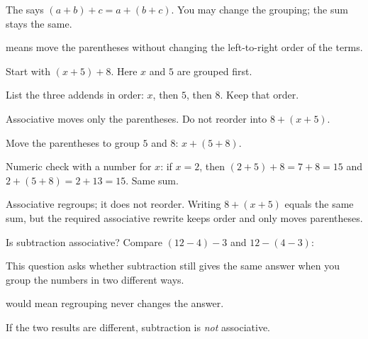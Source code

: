 \begin{words}
  \item The says
        $(a + b) + c = a + (b + c)$. You may change the grouping; the sum stays
        the same.
  \item {}means move the parentheses without changing the
        left-to-right order of the terms.
\end{words}

\begin{steps}
  \item Start with $(x + 5) + 8$. Here $x$ and $5$ are grouped first.
  \item List the three addends in order: $x$, then $5$, then $8$. Keep that
        order.
  \item Associative moves only the parentheses. Do not reorder into
        $8 + (x + 5)$.
  \item Move the parentheses to group $5$ and $8$: $x + (5 + 8)$.
  \item Numeric check with a number for $x$: if $x = 2$, then
        $(2 + 5) + 8 = 7 + 8 = 15$ and $2 + (5 + 8) = 2 + 13 = 15$. Same sum.
\end{steps}


\noindent Associative regroups; it does not reorder. Writing $8 + (x + 5)$
equals the same sum, but the required associative rewrite keeps order and only
moves parentheses.


\noindent Is subtraction associative? Compare $(12 - 4) - 3$ and
$12 - (4 - 3)$:\ansblank


\noindent This question asks whether subtraction still gives the same answer when
you group the numbers in two different ways.

\begin{words}
  \item {}would mean regrouping never changes the answer.
  \item If the two results are different, subtraction is \textit{not}
        associative.
\end{words}

